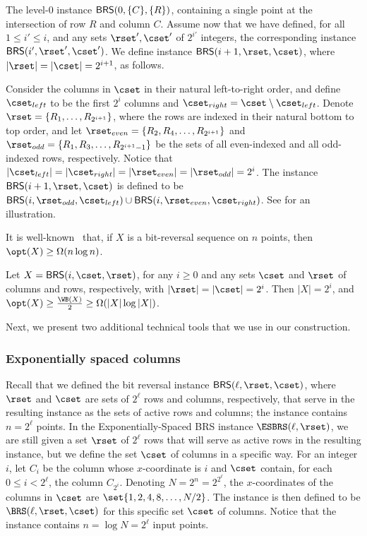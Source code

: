 \documentclass{toc}
\begin{document}
The level-$0$  instance ${\sf BRS}(0,\{C\}, \{R\})$, containing a single point at the intersection of row $R$ and column $C$. 
Assume now that we have defined, for all $1\leq i'\leq i$, and any sets $\rset',\cset'$ of $2^{i'}$ integers, the corresponding instance ${\sf BRS}(i',\rset',\cset')$. We define  instance ${\sf BRS}(i+1,\rset,\cset)$, where $|\rset| = |\cset| = 2^{i+1}$, as follows. 

Consider the columns in $\cset$ in their natural left-to-right order, and define $\cset_{left}$ to be the first $2^i$ columns and $\cset_{right} = \cset \setminus \cset_{left}$. 
Denote $\rset= \{R_1,\ldots, R_{2^{i+1}}\}$, where the rows are indexed in their natural bottom to top order, and let $\rset_{even}=\{R_2,R_4,\ldots, R_{2^{i+1}}\}$ and $\rset_{odd}=\{R_1,R_3,\ldots, R_{2^{i+1}-1}\}$ be the sets of all even-indexed and all odd-indexed rows, respectively.
Notice that $|\cset_{left}| = |\cset_{right}| = |\rset_{even}| = |\rset_{odd}| = 2^i$. 
The instance ${\sf BRS}(i+1, \rset,\cset)$ is defined to be ${\sf BRS}(i,\rset_{odd},\cset_{left}) \cup {\sf BRS}(i,\rset_{even}, \cset_{right})$. 
See  for an illustration. 

%




It is well-known~\cite{wilber} that, if $X$ is a bit-reversal sequence on $n$ points, then $\opt(X)\geq \Omega(n \log n)$. 

\begin{claim}
\label{claim:BRS complexity} 
Let $X= {\sf BRS}(i,\cset,\rset)$, for any $i\geq 0$ and any sets $\cset$ and $\rset$ of columns and rows, respectively, with $|\rset|=|\cset|=2^i$. Then $|X| = 2^i$, and $\opt(X) \geq \frac{\WB(X)}{2} \geq \Omega(|X| \log |X|)$.  
\end{claim} 



%
%
%
%
%
%
%
%
%
Next, we present two additional technical tools that we use in our construction. 
 

\subsubsection{Exponentially spaced columns}


Recall that we defined the bit reversal instance ${\sf BRS}(\ell, \rset, \cset)$, where $\rset$ and $\cset$ are sets of $2^{\ell}$ rows and columns, respectively, that serve in the resulting instance as the sets of active rows and columns; the instance contains $n=2^{\ell}$ points. 
In the Exponentially-Spaced BRS instance $\ESBRS(\ell,\rset)$, we are still given a set $\rset$ of $2^{\ell}$ rows that will serve as active rows in the resulting instance, but we define the set $\cset$ of columns in a specific way. For an integer $i$, let $C_i$ be the column whose $x$-coordinate is $i$ and $\cset$ contain, for each $0\leq  i< 2^{\ell}$, the column $C_{2^i}$. Denoting $N=2^n=2^{2^{\ell}}$, the $x$-coordinates of the columns in $\cset$ are $\set{1,2,4,8,\ldots,N/2}$. 
The instance is then defined to be $\BRS(\ell,\rset,\cset)$ for this specific set $\cset$ of columns.
Notice that the instance contains $n= \log N=  2^{\ell}$ input points.  
\end{document}
